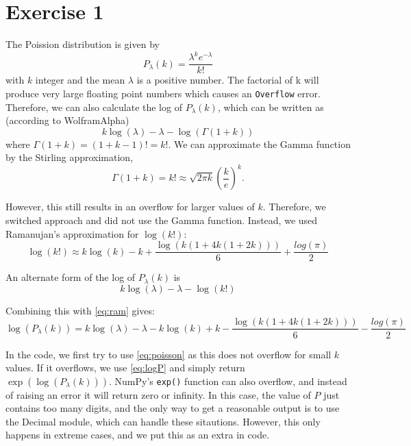 \section{Exercise 1}
The Poission distribution is given by 
\begin{equation}\label{eq:poisson}
    P_{\lambda}(k) = \frac{\lambda^k e^{-\lambda}}{k!}
\end{equation}
with $k$ integer and the mean $\lambda$ is a positive number. The factorial of k will produce very large floating point numbers which causes an \texttt{Overflow} error. Therefore, we can also calculate the log of $P_{\lambda}(k)$, which can be written as (according to WolframAlpha)
\begin{equation}
     k\log(\lambda) - \lambda - \log(\Gamma(1 + k))
\end{equation}
where $\Gamma(1+k) = (1+k-1)! = k!$. We can approximate the Gamma function by the Stirling approximation, 
\begin{equation}
    \Gamma(1+k) = k! \approx \sqrt{2\pi k}\left(\frac{k}{e}\right)^k.
\end{equation}

However, this still results in an overflow for larger values of $k$. Therefore, we switched approach and did not use the Gamma function. Instead, we used Ramanujan's approximation for $\log(k!)$:
\begin{equation}\label{eq:ram}
    \log(k!) \approx k\log(k) - k + \frac{\log(k(1+4k(1 + 2k)))}{6} + \frac{log(\pi)}{2}
\end{equation}

An alternate form of the log of $P_{\lambda}(k)$ is 
\begin{equation}
    k\log(\lambda) - \lambda - \log(k!)
\end{equation}

Combining this with \autoref{eq:ram} gives:
\begin{equation}\label{eq:logP}
    \log(P_{\lambda}(k)) = k\log(\lambda) - \lambda - k\log(k) + k - \frac{\log(k(1+4k(1 + 2k)))}{6} - \frac{log(\pi)}{2}
\end{equation}

In the code, we first try to use \autoref{eq:poisson} as this does not overflow for small $k$ values. If it overflows, we use \autoref{eq:logP} and simply return $\exp(\log(P_{\lambda}(k)))$.
NumPy's \texttt{exp()} function can also overflow, and instead of raising an error it will return zero or infinity. In this case, the value of $P$ just contains too many digits, and the only way to get a reasonable output is to use the Decimal module, which can handle these sitautions. However, this only happens in extreme cases, and we put this as an extra in code.  

